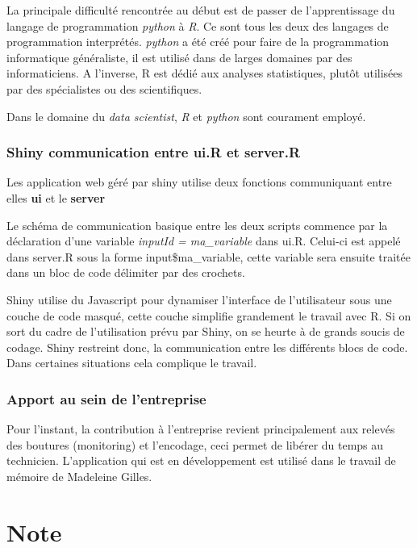 \documentclass[]{report}
\begin{document}
La principale difficulté rencontrée au début est de passer de
l'apprentissage du langage de programmation \emph{python} à \emph{R}. Ce
sont tous les deux des langages de programmation interprétés.
\emph{python} a été créé pour faire de la programmation informatique
généraliste, il est utilisé dans de larges domaines par des
informaticiens. A l'inverse, R est dédié aux analyses statistiques,
plutôt utilisées par des spécialistes ou des scientifiques.

Dans le domaine du \emph{data scientist}, \emph{R} et \emph{python} sont
courament employé.

\subsection{Shiny communication entre ui.R et
server.R}\label{shiny-communication-entre-ui.r-et-server.r}

Les application web géré par shiny utilise deux fonctions communiquant
entre elles \textbf{ui} et le \textbf{server}

Le schéma de communication basique entre les deux scripts commence par
la déclaration d'une variable \emph{inputId = ma\_variable} dans ui.R.
Celui-ci est appelé dans server.R sous la forme input\$ma\_variable,
cette variable sera ensuite traitée dans un bloc de code délimiter par
des crochets.

Shiny utilise du Javascript pour dynamiser l'interface de l'utilisateur
sous une couche de code masqué, cette couche simplifie grandement le
travail avec R. Si on sort du cadre de l'utilisation prévu par Shiny, on
se heurte à de grands soucis de codage. Shiny restreint donc, la
communication entre les différents blocs de code. Dans certaines
situations cela complique le travail.

\subsection{Apport au sein de
l'entreprise}\label{apport-au-sein-de-lentreprise}

Pour l'instant, la contribution à l'entreprise revient principalement
aux relevés des boutures (monitoring) et l'encodage, ceci permet de
libérer du temps au technicien. L'application qui est en développement
est utilisé dans le travail de mémoire de Madeleine Gilles.

\chapter{Note}\label{note}
\end{document}

